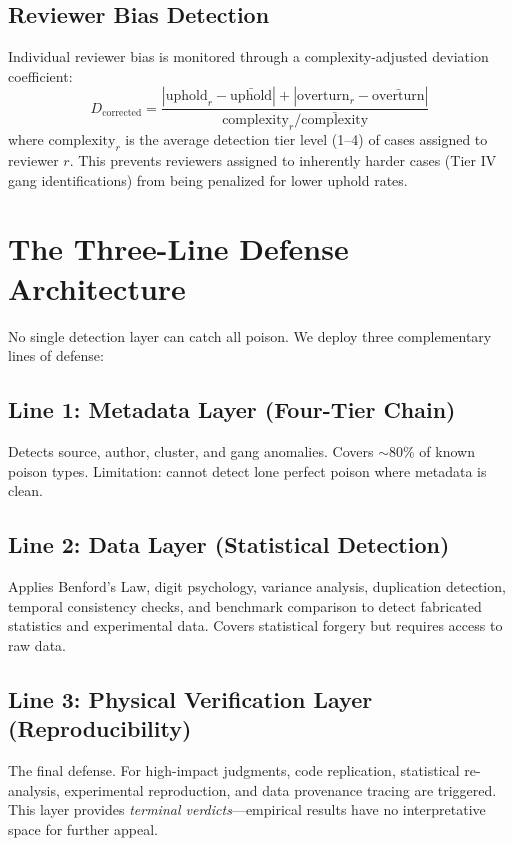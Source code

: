 \documentclass[11pt]{article}
\begin{document}
\subsection{Reviewer Bias Detection}
Individual reviewer bias is monitored through a complexity-adjusted deviation coefficient:
\begin{equation}
  D_{\text{corrected}} = \frac{|\text{uphold}_r - \bar{\text{uphold}}| + 
    |\text{overturn}_r - \bar{\text{overturn}}|}
    {\text{complexity}_r / \bar{\text{complexity}}}
\end{equation}
where $\text{complexity}_r$ is the average detection tier level (1--4) of cases assigned 
to reviewer $r$. This prevents reviewers assigned to inherently harder cases (Tier IV 
gang identifications) from being penalized for lower uphold rates.

\section{The Three-Line Defense Architecture}
\label{sec:three-line}

No single detection layer can catch all poison. We deploy three complementary lines 
of defense:

\subsection{Line 1: Metadata Layer (Four-Tier Chain)}
Detects source, author, cluster, and gang anomalies. Covers $\sim$80\% of known poison 
types. Limitation: cannot detect lone perfect poison where metadata is clean.

\subsection{Line 2: Data Layer (Statistical Detection)}
Applies Benford's Law, digit psychology, variance analysis, duplication detection, 
temporal consistency checks, and benchmark comparison to detect fabricated statistics 
and experimental data. Covers statistical forgery but requires access to raw data.

\subsection{Line 3: Physical Verification Layer (Reproducibility)}
The final defense. For high-impact judgments, code replication, statistical re-analysis, 
experimental reproduction, and data provenance tracing are triggered. This layer provides 
\textit{terminal verdicts}---empirical results have no interpretative space for further 
appeal.
\end{document}
